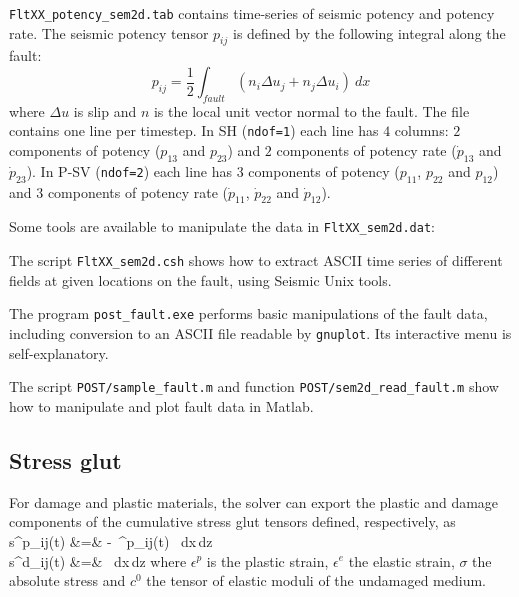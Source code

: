 \begin{sitemize}
  \item \texttt{FltXX\_potency\_sem2d.tab} contains time-series of seismic potency and potency rate. 
The seismic potency tensor $p_{ij}$ is defined by the following integral along the fault:
\begin{equation}
p_{ij} = \frac{1}{2} \int_{fault} (n_i \Delta u_j + n_j \Delta u_i)  \ dx
\end{equation}
where $\Delta u$ is slip and $n$ is the local unit vector normal to the fault.
The file contains one line per timestep.
In SH (\texttt{ndof=1}) each line has $4$ columns: $2$ components of potency ($p_{13}$ and $p_{23}$)
and $2$ components of potency rate ($\dot{p}_{13}$ and $\dot{p}_{23}$).
In P-SV (\texttt{ndof=2}) each line has $3$ components of potency ($p_{11}$, $p_{22}$ and $p_{12}$)
and $3$ components of potency rate ($\dot{p}_{11}$, $\dot{p}_{22}$ and $\dot{p}_{12}$).
\end{sitemize}

Some tools are available to manipulate the data in \texttt{FltXX\_sem2d.dat}:
\begin{sitemize}
\item The script \texttt{FltXX\_sem2d.csh} shows 
how to extract ASCII time series of different 
fields at given locations on the fault, using Seismic Unix tools.
\item The program \texttt{post\_fault.exe} performs basic manipulations of the 
fault data, including conversion to an ASCII file readable by \texttt{gnuplot}. 
Its interactive menu is self-explanatory.
\item The script \texttt{POST/sample\_fault.m} 
and function \texttt{POST/sem2d\_read\_fault.m} show how
to manipulate and plot fault data in Matlab.
\end{sitemize}

\subsection{Stress glut}

For damage and plastic materials,
the solver can export the plastic and damage components of the
cumulative stress glut tensors 
defined, respectively, as
\eqa
  s^p_{ij}(t) &=& -\mu\, \epsilon^{p}_{ij}(t) \ dx\,dz\\
  s^d_{ij}(t) &=&   \ dx\,dz
\ena
where $\epsilon^p$ is the plastic strain, $\epsilon^e$ the elastic strain,
$\sigma$ the absolute stress
and $c^0$ the tensor of elastic moduli of the undamaged medium. 

